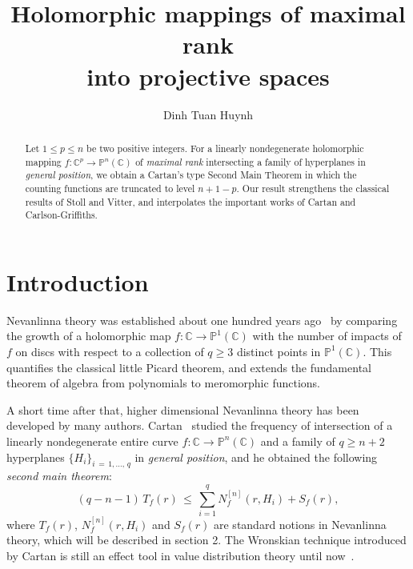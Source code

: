 \documentclass[english, 12pt]{amsart}
\theoremstyle{plain}
\theoremstyle{remark}
\numberwithin{equation}{section}
\theoremstyle{plain}
\theoremstyle{named}
\begin{document}
 
\title[Holomorphic mappings of maximal rank into projective spaces]{\bf Holomorphic mappings of maximal rank\\
into projective spaces} 




\author{Dinh Tuan Huynh}

\address{Department of Mathematics, University of Education, Hue University, 34 Le Loi St., Hue City, Vietnam}




	\begin{abstract} Let $1\leq p\leq n$ be two positive integers.
For a linearly nondegenerate holomorphic mapping $f\colon\mathbb{C}^p\rightarrow\mathbb{P}^n(\mathbb{C})$ of {\sl maximal rank} intersecting a family of hyperplanes in {\sl general position}, we obtain a Cartan's type Second Main Theorem in which the counting functions are truncated to level $n+1-p$. Our result strengthens the classical results of Stoll and Vitter, and interpolates the important works of Cartan and Carlson-Griffiths.
	\end{abstract}


\maketitle
\section{Introduction}
Nevanlinna theory was established about one hundred years ago~\cite{Nevanlinna1925} by comparing the growth of a holomorphic map $f:\mathbb{C}\rightarrow\mathbb{P}^1(\mathbb{C})$ with  the number of impacts of $f$ on discs with respect to a collection of $q\geq3$ distinct points in $\mathbb{P}^1(\mathbb{C})$. This quantifies the classical little Picard theorem, and extends the fundamental theorem of algebra from polynomials to meromorphic functions.
	
A short time after that, higher dimensional Nevanlinna theory has been developed by many authors. Cartan~\cite{Cartan1933} studied the frequency of intersection of a linearly nondegenerate entire curve
	$f\colon\mathbb{C}\rightarrow\mathbb{P}^n(\mathbb{C})$
	and a family of $q\geq n+2$ hyperplanes $\{H_i\}_{i\,=\,1,\dots,\, q}$ in {\sl general position}, and he obtained the following {\sl second main theorem}:
	\begin{equation}
	\label{Cartan SMT}
	(q-n-1)
	\,
	T_f(r)
	\,
	\leq
	\,
	\sum_{i=1}^q N_f^{[n]}(r,H_i)+S_f(r),
	\end{equation}
	where $T_f(r)$, $N_f^{[n]}(r,H_i)$ and $S_f(r)$ are standard notions in Nevanlinna theory, which will be described in section 2. The Wronskian technique introduced by Cartan is still an effect tool in value distribution theory until now~\cite{Ru2009,Ru2018,HX2022}. 
	
\end{document}

